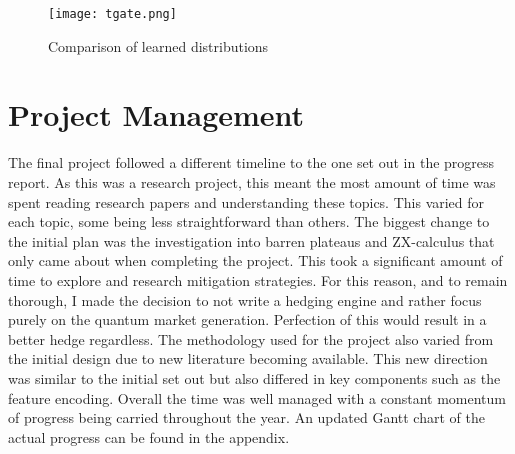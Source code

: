 \documentclass[12pt]{article}
\numberwithin{equation}{section}
\begin{document}
\begin{figure}[h!]
    \centering
    \texttt{[image: tgate.png]}
    \caption{Comparison of learned distributions}
\end{figure}


\newpage 
\section{Project Management}
The final project followed a different timeline to the one set out in the 
progress report. As this was a research project, this meant the most amount of 
time was spent reading research papers and understanding these topics. This varied 
for each topic, some being less straightforward than others.
The biggest change to the initial plan was the investigation into barren plateaus 
and ZX-calculus that only came about when completing the project. This took a 
significant amount of time to explore and research mitigation strategies. 
For this reason,
and to remain thorough, I made the decision to not write a hedging engine and rather 
focus purely on the quantum market generation. Perfection of this would result in 
a better hedge regardless. The methodology used for the project also varied from 
the initial design due to new literature becoming available. This new direction 
was similar to the initial set out but also differed in key components such as 
the feature encoding. Overall the time was well managed with a constant 
momentum of progress being carried throughout the year. 
An updated Gantt chart of the actual progress 
can be found in the appendix.  
\newpage
\end{document}
